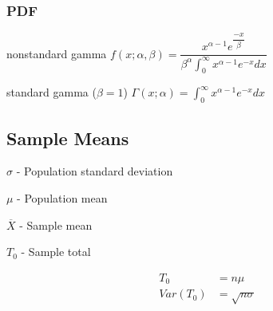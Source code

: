 \documentclass[12pt,fleqn]{article}
\begin{document}
\subsubsection{PDF}

nonstandard gamma
$f(x;\alpha, \beta) = \dfrac{x^{\alpha-1}e^{\dfrac{-x}{\beta}}}{\beta^\alpha \int_0^\infty x^{\alpha-1}e^{-x}dx}$


standard gamma ($\beta=1$)
$\Gamma(x; \alpha) = \int_0^\infty x^{\alpha-1}e^{-x}dx$

\subsection{Sample Means}

$\sigma$ - Population standard deviation

$\mu$ - Population mean

$\overline{X}$ - Sample mean

$T_0$ - Sample total

\begin{align*}
T_0 &= n\mu\\
Var(T_0) &= \sqrt{n\sigma}
\end{align*}
\end{document}
